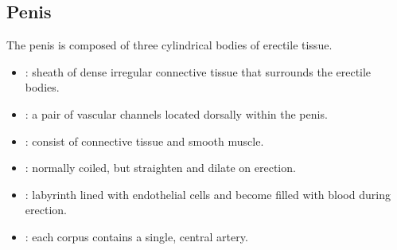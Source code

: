 \newpage

\subsection{Penis}
The penis is composed of three cylindrical bodies of erectile tissue.
\begin{center}
\end{center} 
\bigskip
\begin{multicols}{2}
\begin{itemize}
  \item {}: sheath of dense irregular connective tissue that surrounds the erectile bodies.
  
  \begin{center}
  \end{center}
  
  \item {}: a pair of vascular channels located dorsally within the penis. 
  
  \begin{center}
  \end{center}
  
  \item {}: consist of connective tissue and smooth muscle. 
  
  \begin{center}
  \end{center}
  
  \item {}: normally coiled, but straighten and dilate on erection.
  
  \begin{center}
  \end{center}
  
  \item {}:  labyrinth lined with endothelial cells and become filled with blood during erection.
  
  \begin{center}
  \end{center}
  
  \item {}: each corpus contains a single, central artery.
  

\end{itemize}
\end{multicols}
